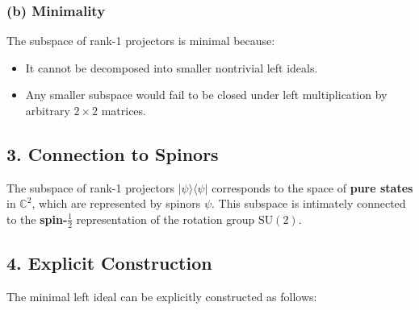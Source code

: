 \documentclass{article}
\begin{document}
\subsubsection*{(b) Minimality}

The subspace of rank-1 projectors is minimal because:

\begin{itemize}
\item It cannot be decomposed into smaller nontrivial left ideals. 

\item Any smaller subspace would fail to be closed under left multiplication
by arbitrary $2 \times 2 $ matrices.
\end{itemize}

\subsection*{3. Connection to Spinors}

The subspace of rank-1 projectors $|\psi\rangle \langle \psi| $ corresponds
to the space of \textbf{pure states} in $\mathbb{C}^2 $, which are
represented by spinors $\psi $. This subspace is intimately connected to the 
\textbf{spin-$\frac{1}{2} $} representation of the rotation group $\text{SU}%
(2) $.

\subsection*{4. Explicit Construction}

The minimal left ideal can be explicitly constructed as follows:
\end{document}

